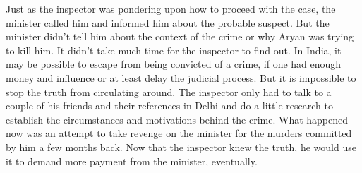 Just as the inspector was pondering upon how to proceed with the case, the
minister called him and informed him about the probable suspect. But the
minister didn't tell him about the context of the crime or why Aryan was trying
to kill him. It didn't take much time for the inspector to find out. In India,
it may be possible to escape from being convicted of a crime, if one had enough
money and influence or at least delay the judicial process. But it is impossible
to stop the truth from circulating around. The inspector only had to talk to a
couple of his friends and their references in Delhi and do a little research to
establish the circumstances and motivations behind the crime. What happened now
was an attempt to take revenge on the minister for the murders committed by him a few
months back. Now that the inspector knew the truth, he would use it to demand
more payment from the minister, eventually.